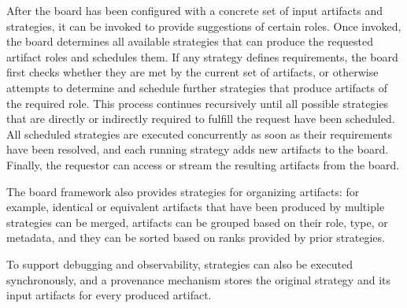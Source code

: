 After the board has been configured with a concrete set of input artifacts and strategies, it can be invoked to provide suggestions of certain roles.
Once invoked, the board determines all available strategies that can produce the requested artifact roles and schedules them.
If any strategy defines requirements, the board first checks whether they are met by the current set of artifacts, or otherwise attempts to determine and schedule further strategies that produce artifacts of the required role.
This process continues recursively until all possible strategies that are directly or indirectly required to fulfill the request have been scheduled.
All scheduled strategies are executed concurrently as soon as their requirements have been resolved, and each running strategy adds new artifacts to the board.
Finally, the requestor can access or stream the resulting artifacts from the board.

The board framework also provides strategies for organizing artifacts:
for example, identical or equivalent artifacts that have been produced by multiple strategies can be merged, artifacts can be grouped based on their role, type, or metadata, and they can be sorted based on ranks provided by prior strategies.

To support debugging and observability, strategies can also be executed synchronously, and a provenance mechanism stores the original strategy and its input artifacts for every produced artifact.

